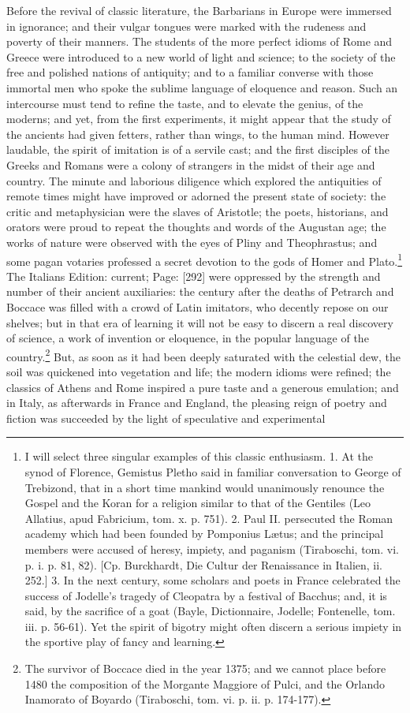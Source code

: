 Before the revival of classic literature, the Barbarians in Europe were immersed in ignorance; and their vulgar tongues were marked with the rudeness and poverty of their manners. The students of the more perfect idioms of Rome and Greece were introduced to a new world of light and science; to the society of the free and polished nations of antiquity; and to a familiar converse with those immortal men who spoke the sublime language of eloquence and reason. Such an intercourse must tend to refine the taste, and to elevate the genius, of the moderns; and yet, from the first experiments, it might appear that the study of the ancients had given fetters, rather than wings, to the human mind. However laudable, the spirit of imitation is of a servile cast; and the first disciples of the Greeks and Romans were a colony of strangers in the midst of their age and country. The minute and laborious diligence which explored the antiquities of remote times might have improved or adorned the present state of society: the critic and metaphysician were the slaves of Aristotle; the poets, historians, and orators were proud to repeat the thoughts and words of the Augustan age; the works of nature were observed with the eyes of Pliny and Theophrastus; and some pagan votaries professed a secret devotion to the gods of Homer and Plato.\footnote{I will select three singular examples of this classic enthusiasm. 1. At the synod of Florence, Gemistus Pletho said in familiar conversation to George of Trebizond, that in a short time mankind would unanimously renounce the Gospel and the Koran for a religion similar to that of the Gentiles (Leo Allatius, apud Fabricium, tom. x. p. 751). 2. Paul II. persecuted the Roman academy which had been founded by Pomponius Lætus; and the principal members were accused of heresy, impiety, and paganism (Tiraboschi, tom. vi. p. i. p. 81, 82). [Cp. Burckhardt, Die Cultur der Renaissance in Italien, ii. 252.] 3. In the next century, some scholars and poets in France celebrated the success of Jodelle\texthebrew{}’s tragedy of Cleopatra by a festival of Bacchus; and, it is said, by the sacrifice of a goat (Bayle, Dictionnaire, Jodelle; Fontenelle, tom. iii. p. 56-61). Yet the spirit of bigotry might often discern a serious impiety in the sportive play of fancy and learning.} The Italians Edition: current; Page: [292] were oppressed by the strength and number of their ancient auxiliaries: the century after the deaths of Petrarch and Boccace was filled with a crowd of Latin imitators, who decently repose on our shelves; but in that era of learning it will not be easy to discern a real discovery of science, a work of invention or eloquence, in the popular language of the country.\footnote{The survivor of Boccace died in the year 1375; and we cannot place before 1480 the composition of the Morgante Maggiore of Pulci, and the Orlando Inamorato of Boyardo (Tiraboschi, tom. vi. p. ii. p. 174-177).} But, as soon as it had been deeply saturated with the celestial dew, the soil was quickened into vegetation and life; the modern idioms were refined; the classics of Athens and Rome inspired a pure taste and a generous emulation; and in Italy, as afterwards in France and England, the pleasing reign of poetry and fiction was succeeded by the light of speculative and experimental 